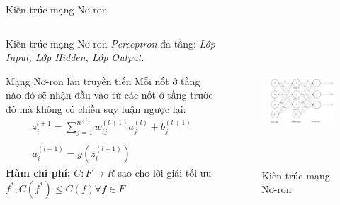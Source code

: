 	\begin{frame}{Kiến trúc mạng Nơ-ron}
        \begin{columns}
		\begin{itemize}
    		\begin{block}{Kiến trúc mạng Nơ-ron}
    		     \emph{Perceptron} đa tầng: \emph{Lớp Input, Lớp Hidden, Lớp Output}.
    		\end{block}
    		\begin{block}{Mạng Nơ-ron lan truyền tiến}
    		    Mỗi nốt ở tầng nào đó sẽ nhận đầu vào từ các nốt ở tầng trước đó mà không có chiều suy luận ngược lại:
    		    \begin{equation}
                  \begin{array}{l}
                    z_i^{l+1} = \sum_{j=1}^{n^{(l)}}w_{ij}^{(l+1)}a_j^{(l)} + b_j^{(l+1)} \\
                    \\
                    a_i^{(l+1)} = g(z_i^{(l+1)})
                  \end{array}
                \end{equation}
                \textbf{Hàm chi phí:} $C: F \rightarrow R$ sao cho lời giải tối ưu $f^*, C(f^*)  \leq C(f) \forall f \in F$
    		\end{block}
		\end{itemize}
		\begin{figure}[ht]
            \centering
            \includegraphics[width=1.0\linewidth, height=4.8cm]{images/ff-neural.png}
            \caption{Kiến trúc mạng Nơ-ron}
            \label{fig:problem:neural-architect}
        \end{figure}
		\end{columns}
	\end{frame}
